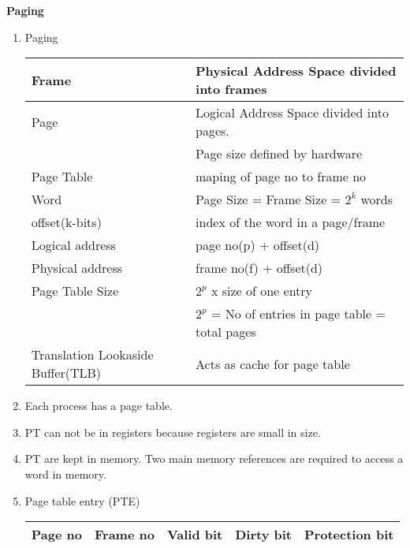 
\centerline{\textbf{ \LARGE Paging}}




\begin{enumerate}

  \begin{figure}[h]
      \centering   \texttt{[image: ./images/paging\_01.jpeg]}
  \end{figure}
  \item Paging \\
  \begin{myTableStyle}
    \begin{tabular}{ |m{3.5cm}|m{10cm}| } \hline
        Frame           &     Physical Address Space divided into frames                  \\ \hline
        Page            &     Logical   Address Space divided into pages.                 \\
                        &     Page size defined by hardware                               \\ \hline
        Page Table      &     maping of page no to frame no                               \\ \hline
        Word            &     Page Size = Frame Size =  \(2^k\) words                     \\ \hline
        offset(k-bits)  &     index of the word in a page/frame  \\ \hline
        Logical address &     page no(p)  +  offset(d)                                    \\ \hline
        Physical address&     frame no(f) +  offset(d)                                    \\ \hline
        Page Table Size &     \(2^p\) x size of one entry                                       \\
                        &     \(2^p\) = No of entries in page table = total pages                \\ \hline
        Translation \mbox{Lookaside} Buffer(TLB) & Acts as cache for page table                    \\ \hline
    \end{tabular}
  \end{myTableStyle}
  \vspace{0.08in}

  \item Each process has a page table.
  \item PT can not be in registers because registers are small in size.
  \item PT are kept in memory. Two main memory references are required to access a word in memory.
  \item Page table entry (PTE) \\
  \begin{myTableStyle}
    \begin{tabular}{ |m{2cm}|m{2cm}|m{2cm}|m{2cm}|m{3cm}| } \hline
        Page no &  Frame no & Valid bit & Dirty bit & Protection bit  \\ \hline
    \end{tabular}
  \end{myTableStyle}



\end{enumerate}
